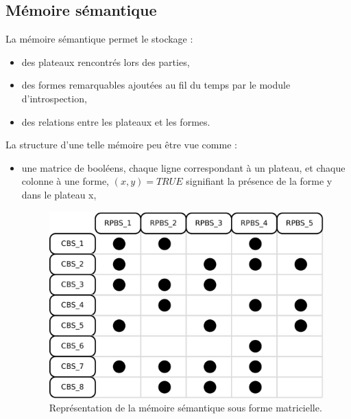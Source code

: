 \subsection{Mémoire sémantique}
\label{conception_memoire_semantique}

La mémoire sémantique permet le stockage :
\begin{itemize}
\item des plateaux rencontrés lors des parties,
\item des formes remarquables ajoutées au fil du temps par le module  d'introspection,
\item des relations entre les plateaux et les formes.
\end{itemize}

La structure d'une telle mémoire peu être vue comme :
\begin{itemize}
\item une matrice de booléens, chaque ligne correspondant à un plateau, et chaque colonne à une forme, $(x,y)=TRUE$ signifiant la présence de la forme y dans le plateau x,
\begin{figure}[H]
\includegraphics[width=\textwidth]{files/memoire/context_matrix}
\caption{Représentation de la mémoire sémantique sous forme matricielle.}
\end{figure}



\end{itemize}
